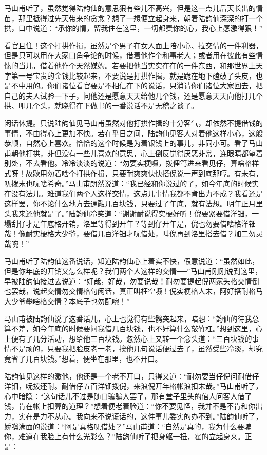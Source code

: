 \documentclass[12pt,UTF8]{ctexbook}
\begin{document}
{{{马山甫听了，虽然觉得陆韵仙的意思狠有些儿不高兴，但是这一点儿后天长出的情苗，那里抵得过先天带来的贪念？想了一想便立起身来，朝着陆韵仙深深的打一个拱，口中说道：“承你的情，留我住在这里，一切都费你的心，我心上感激得狠！”

看官且住！这个打拱作揖，虽然是个男子在女人面上陪小心、拉交情的一件利器，但是只可以用在大家口角争论的时候，借着他作个和事老人；或者用在彼此有些情愫的当儿，借着他作个天然媒妁。若要把他当实实在在的一件东西，和那世界上天字第一号宝贵的金钱比较起来，不要说是打拱作揖，就是跪在地下磕破了头皮，也是不中用的。你们诸位看官要是不相信在下的说话，只消请你们诸位大家回去，把自己的夫人试验一下子，问他还是愿意天天给他几个钱，还是愿意天天向他打几个拱、叩几个头，就晓得在下做书的一番说话不是无稽之谈了。

闲话休提。只说陆韵仙见马山甫虽然对他打拱作揖的十分客气，却依然不提借钱的事情，不由得心上更加不快。若在乎日之间，陆韵仙见客人对着他这样小心，这般恭顺，自然心上喜欢。恰恰的这个时候是为着银钱上的事儿，非同小可。看了马山甫朝他打拱，非但没有一些儿喜欢的意思，心上倒反觉得厌恶非常，连眼睛都望着别处，不去看他。冷冷淡淡的说道：“勿要实梗嗫，拨俚笃进来看见仔，算啥格样式呀！故歇用勿着啥个打拱作揖，只要耐爽爽快快搭倪说一声到底那哼。有未有，呒拨末也呒啥希奇。”马山甫朗然说道：“我已经和你说过的了，如今年底的时候实在没有法儿。难道我们两个人这样交情，这点儿事情我都不肯出力不成？我看还是这样罢，你不论什么地方去通融几百块钱，只要过了年底，就有法想。明年正月里头我来还他就是了。”陆韵仙冷笑道：“谢谢耐说得实梗好听！倪要紧要借洋钿，一塌刮仔才是年底格开销，洛里等得到开年？等到仔开年是，倪也勿要借啥格洋钿哉！像耐实梗格大少爷，要借几百洋钿才呒借处，叫倪再到洛里搭去借？加二勿灵哉啘！”

马山甫听了陆韵仙这番说话，知道陆韵仙心上着实不快，假意说道：“虽然如此，但是你年底的开销又怎么样呢？我们两个人这样的交情──”马山甫刚刚说到这里，早被陆韵仙接过去说道：“好哉，好哉，勿要说哉！耐勿要提起倪两家头格交情倒也罢哉，说起交情勿交情格句闲话，真正叫枉空嗫！倪实梗格人末，阿好搭耐格马大少爷攀啥格交情？本底子也勿配啘！”

马山甫被陆韵仙说了这番话儿，心上也觉得有些鹘突起来，暗想：“韵仙的待我总算不差，如今年底的时候要问我借几百块钱，也不好算什么敲竹杠。”想到这里，心上便有了几分活动，想给他三百块钱。忽然心上又转一个念头道：“三百块钱的事情不是顽的，只要我把脸皮老一老，挨他几句说话便过去了，虽然受些冷淡，却究竟省了几百块钱。”想着，便坐在那里，也不开口。

陆韵仙见这样的激他，他还是一个老不开口，只得又道：“耐勿要当仔倪问耐借仔洋钿，呒拨还耐。耐借仔五百洋钿拨倪，来浪倪开年格帐浪扣末哉。”马山甫听了，心中暗隐：“这句话儿不过是随口骗骗人罢了，那有堂子里头的倌人问客人借了钱，肯在帐上扣算的道理？”想着便老着脸道：“你不要见怪，我并不是不肯和你出力，实在是力不从心。我向来不说谎话的，这件事儿委实的办不到。”陆韵仙听了，娇嗔满面的说道：“阿是真格呒借处？”马山甫道：“自然是真的，我为什么要骗你，难道在我脸上有什么光彩么？”陆韵仙听了把身躯一扭，霍的立起身来。正是：

}}}
\end{document}
